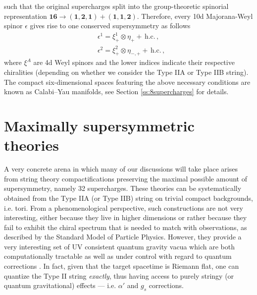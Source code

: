 %
such that the original supercharges split into the group-theoretic spinorial representation $\mathbf{16} \rightarrow (\boldsymbol{1},\boldsymbol{2},\boldsymbol{1})+ (\boldsymbol{1},\boldsymbol{1},\boldsymbol{2} )$. Therefore, every 10d Majorana-Weyl spinor $\epsilon$ gives rise to one conserved supersymmetry as follows
%
\begin{equation}\label{eq:TypeIIspinorsonCY}
\begin{split}
&\epsilon^1=\xi^1_{+} \otimes \eta_{+} + \, \mathrm{h.c.} \, ,\\
&\epsilon^2=\xi^2_{+} \otimes \eta_{-,+} +\,  \mathrm{h.c.}\, ,
\end{split}
\end{equation}
%
where $\xi^A$ are 4d Weyl spinors and the lower indices indicate their respective chiralities (depending on whether we consider the Type IIA or Type IIB string). The compact six-dimensional spaces featuring the above necessary conditions are known as Calabi--Yau manifolds, see Section \ref{ss:8supercharges} for details. 


\section{Maximally supersymmetric theories}\label{s:maxsugraintro}

A very concrete arena in which many of our discussions will take place arises from string theory compactifications preserving the maximal possible amount of supersymmetry, namely 32 supercharges. These theories can be systematically obtained from the Type IIA (or Type IIB) string on trivial compact backgrounds, i.e. tori. From a phenomenological perspective, such constructions are not very interesting, either because they live in higher dimensions or rather because they fail to exhibit the chiral spectrum that is needed to match with observations, as described by the Standard Model of Particle Physics. However, they provide a very interesting set of UV consistent quantum gravity vacua which are both computationally tractable as well as under control with regard to quantum corrections \cite{Cecotti:2015wqa}. In fact, given that the target spacetime is Riemann flat, one can quantize the Type II string \emph{exactly}, thus having access to purely stringy (or quantum gravitational) effects --- i.e. $\alpha'$ and $g_s$ corrections. %

